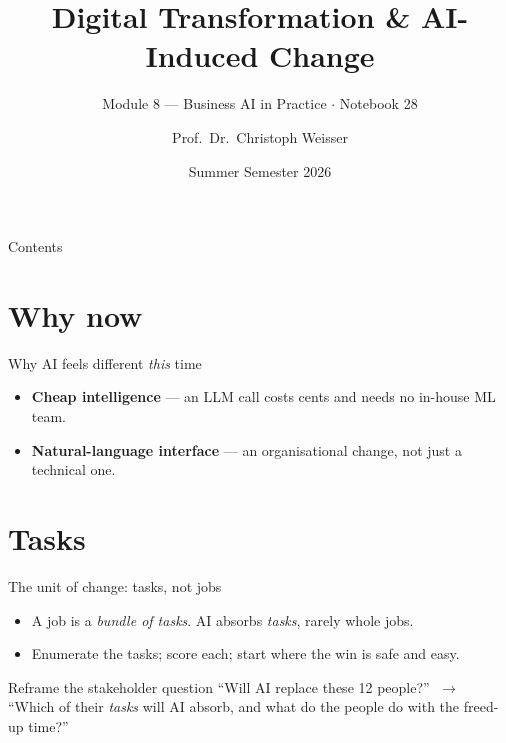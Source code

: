 \documentclass[aspectratio=169,11pt]{beamer}
\title{Digital Transformation \& AI-Induced Change}
\subtitle{Module 8 --- Business AI in Practice $\cdot$ Notebook 28}
\author{Prof.\ Dr.\ Christoph Weisser}
\institute{HSBI}
\date{Summer Semester 2026}
\begin{document}
\begin{frame}\titlepage\end{frame}

\begin{frame}{Contents}
  \tableofcontents[hideallsubsections]
\end{frame}

\section{Why now}
\begin{frame}{Why AI feels different \emph{this} time}
  \begin{center}
  \end{center}
  \begin{itemize}
    \item \textbf{Cheap intelligence} --- an LLM call costs cents and needs no in-house ML team.
    \item \textbf{Natural-language interface} --- an organisational change, not just a technical one.
  \end{itemize}
\end{frame}

\section{Tasks}
\begin{frame}{The unit of change: tasks, not jobs}
  \begin{itemize}
    \item A job is a \emph{bundle of tasks}. AI absorbs \emph{tasks}, rarely whole jobs.
    \item Enumerate the tasks; score each; start where the win is safe and easy.
  \end{itemize}
  \begin{exampleblock}{Reframe the stakeholder question}
    ``Will AI replace these 12 people?'' $\;\to\;$ ``Which of their \emph{tasks} will AI absorb, and what do the people do with the freed-up time?''
  \end{exampleblock}
\end{frame}
\end{document}
